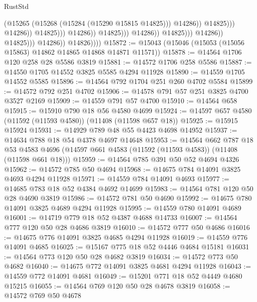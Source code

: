 \begin{lexlean}{RustStd}
\begin{coremodule}
                                                                (@15265
                                                                  (@15268
                                                                    (@15284 (@15290 @15815 @14825)))
                                                                  @14286))
                                                              @14825)))
                                                        @14286))
                                                    @14825)))
                                              @14286))
                                          @14825)))
                                    @14286))
                                @14825)))
                          @14286))
                      @14825)))
                @14286))
            @14826))))
@15872 := @15043 (@15046 (@15053 (@15056 @15863) @14862 @14865 @14868 @14871 @11571))
@15878 := @14564 @1706 @120 @258 @28 @5586 @3819
@15881 := @14572 @1706 @258 @5586
@15887 := @14550 @1705 @14552 @3825 @5585 @4294 @11928
@15890 := @14559 @1705 @14552 @5585
@15896 := @14564 @792 @1704 @251 @260 @4702 @5584
@15899 := @14572 @792 @251 @4702
@15906 := @14578 @791 @57 @251 @3825 @4700 @3527 @2169
@15909 := @14559 @791 @57 @4700
@15910 := @14564 @658
@15915 := @15910 @790 @18 @56 @4580 @4699
@15924 := @14597 @657 @4580 (@11592 (@11593 @4580)) (@11408 (@11598 @657 @18))
@15925 := @15915 @15924
@15931 := @14929 @789 @48 @55 @4423 @4698 @14952
@15937 := @14634 @788 @18 @54 @4378 @4697 @14648
@15953 := @14564
    @662
    @787
    @18
    @53
    @4583
    @4696
    (@14597 @661 @4583 (@11592 (@11593 @4583)) (@11408 (@11598 @661 @18)))
@15959 := @14564 @785 @391 @50 @52 @4694 @4326
@15962 := @14572 @785 @50 @4694
@15968 := @14675 @784 @14091 @3825 @4693 @4294 @11928
@15971 := @14559 @784 @14091 @4693
@15977 := @14685 @783 @18 @52 @4384 @4692 @14699
@15983 := @14564 @781 @120 @50 @28 @4690 @3819
@15986 := @14572 @781 @50 @4690
@15992 := @14675 @780 @14091 @3825 @4689 @4294 @11928
@15995 := @14559 @780 @14091 @4689
@16001 := @14719 @779 @18 @52 @4387 @4688 @14733
@16007 := @14564 @777 @120 @50 @28 @4686 @3819
@16010 := @14572 @777 @50 @4686
@16016 := @14675 @776 @14091 @3825 @4685 @4294 @11928
@16019 := @14559 @776 @14091 @4685
@16025 := @15167 @775 @18 @52 @4446 @4684 @15181
@16031 := @14564 @773 @120 @50 @28 @4682 @3819
@16034 := @14572 @773 @50 @4682
@16040 := @14675 @772 @14091 @3825 @4681 @4294 @11928
@16043 := @14559 @772 @14091 @4681
@16049 := @15201 @771 @18 @52 @4449 @4680 @15215
@16055 := @14564 @769 @120 @50 @28 @4678 @3819
@16058 := @14572 @769 @50 @4678

\end{coremodule}
\end{lexlean}
